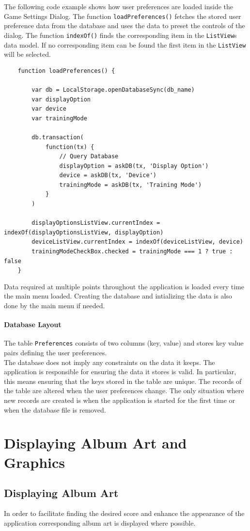 The following code example shows how user preferences are loaded inside the Game Settings Dialog. The function {\tt loadPreferences()} fetches the stored user preference data from the database and uses the data to preset the controls of the dialog. The function {\tt indexOf()} finds the corresponding item in the {\tt ListView}s data model. If no corresponding item can be found the first item in the {\tt ListView} will be selected.
\begin{lstlisting}
    function loadPreferences() {

        var db = LocalStorage.openDatabaseSync(db_name)
        var displayOption
        var device
        var trainingMode

        db.transaction(
            function(tx) {
                // Query Database
                displayOption = askDB(tx, 'Display Option')
                device = askDB(tx, 'Device')
                trainingMode = askDB(tx, 'Training Mode')
            }
        )

        displayOptionsListView.currentIndex = indexOf(displayOptionsListView, displayOption)
        deviceListView.currentIndex = indexOf(deviceListView, device)
        trainingModeCheckBox.checked = trainingMode === 1 ? true : false
    }
\end{lstlisting}
Data required at multiple points throughout the application is loaded every time the main menu loaded. Creating the database and intializing the data is also done by the main menu if needed. 
\paragraph{Database Layout}
The table {\tt Preferences} consists of two columns (key, value) and stores key value pairs defining the user preferences. \\
The database does not imply any constraints on the data it keeps. The application is responsible for ensuring the data it stores is valid. In particular, this means ensuring that the keys stored in the table are unique. The records of the table are altered when the user preferences change. The only situation where new records are created is when the application is started for the first time or when the database file is removed.
\section {Displaying Album Art and Graphics}
\subsection {Displaying Album Art}
In order to facilitate finding the desired score and enhance the appearance of the application corresponding album art is displayed where possible. 


